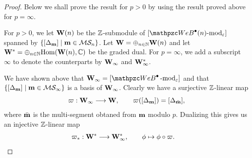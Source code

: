 \begin{proof}
Below we shall prove the result for $p>0$ by using the result proved above for $p=\infty$. 




For $p>0$, we let $\mathbf{W}(n)$ be the $\mathbb{Z}$-submodule of 
$ [\qAW(n)\text{-mod}_\eps]$ spanned by $\{[\Delta_{\mathbf{m}}] \mid \mathbf{m}\in \mathcal{M}\mathcal{S}_n\}$. Let $\mathbf{W}=\oplus_{n\in \mathbb{N}}\mathbf{W}(n)$ and let $\mathbf{W}^*=\oplus_{n\in \mathbb{N}}{\rm Hom}(\mathbf{W}(n),\mathbb{C})$ be the graded dual.
For $p=\infty$, we add a subscript $\infty$ to denote the counterparts by $\mathbf{W}_\infty$ and $ \mathbf{W}_\infty^*$. 

We have shown above that $\bfW_\infty =[\qAW \modf_\eps]$ and that $\{[\Delta_{\mathbf{m}}]\mid \mathbf{m}\in\mathcal{M}\mathcal{S}_\infty\}$ is a basis of $\mathbf{W}_\infty$.
Clearly we have a surjective $\mathbb{Z}$-linear  map 
\[
\varpi: \mathbf{W}_\infty \longrightarrow \mathbf{W},
\qquad
\varpi([\Delta_{\mathbf{m}}])=[\Delta_{\bar{\mathbf{m}}}], 
\]
where $\bar{\mathbf{m}}$ is the multi-segment obtaned from $\mathbf{m}$ modulo $p$. Dualizing this gives us an injective $\mathbb{Z}$-linear map 
\begin{align*}
  \varpi_*:  \mathbf{W}^* &\longrightarrow \mathbf{W}_\infty^*, 
  \qquad
    \phi \mapsto \phi \circ \varpi. 
\end{align*}


\end{proof}
